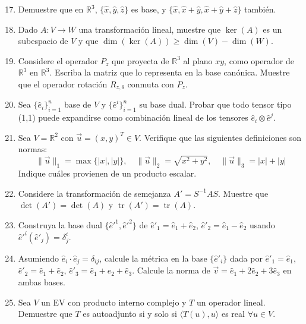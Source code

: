 \documentclass[12pt,a4paper]{article}
\begin{document}
\begin{enumerate}[1.]
\setcounter{enumi}{16}

\item Demuestre que en $\mathbb{R}^3$, $\{\hat{x},\hat{y},\hat{z}\}$ es base, y $\{\hat{x},\hat{x}+\hat{y},\hat{x}+\hat{y}+\hat{z}\}$ también.

\item Dado $A: V \to W$ una transformación lineal, muestre que $\ker(A)$ es un subespacio de $V$ y que $\dim(\ker(A)) \geq \dim(V) - \dim(W)$.

\item Considere el operador $P_z$ que proyecta de $\mathbb{R}^3$ al plano $xy$, como operador de $\mathbb{R}^3$ en $\mathbb{R}^3$. Escriba la matriz que lo representa en la base canónica. Muestre que el operador rotación $R_{z,\theta}$ conmuta con $P_z$.

\item Sea $\{\hat{e}_i\}_{i=1}^n$ base de $V$ y $\{\hat{e}^i\}_{i=1}^n$ su base dual. Probar que todo tensor tipo (1,1) puede expandirse como combinación lineal de los tensores $\hat{e}_i\otimes\hat{e}^j$.

\item Sea $V=\mathbb{R}^2$ con $\vec{u}=(x,y)^T\in V$. Verifique que las siguientes definiciones son normas:
\[
\|\vec{u}\|_1 = \max\{|x|,|y|\},\quad
\|\vec{u}\|_2 = \sqrt{x^2+y^2},\quad
\|\vec{u}\|_3 = |x|+|y|
\]
Indique cuáles provienen de un producto escalar.

\item Considere la transformación de semejanza $A' = S^{-1}AS$. Muestre que $\det(A')=\det(A)$ y $\operatorname{tr}(A')=\operatorname{tr}(A)$.

\item Construya la base dual $\{\hat{e}'^1,\hat{e}'^2\}$ de $\hat{e}'_1=\hat{e}_1+\hat{e}_2$, $\hat{e}'_2=\hat{e}_1-\hat{e}_2$ usando $\hat{e}'^i(\hat{e}'_j)=\delta^i_j$.

\item Asumiendo $\hat{e}_i\cdot\hat{e}_j=\delta_{ij}$, calcule la métrica en la base $\{\hat{e}'_i\}$ dada por $\hat{e}'_1=\hat{e}_1$, $\hat{e}'_2=\hat{e}_1+\hat{e}_2$, $\hat{e}'_3=\hat{e}_1+\hat{e}_2+\hat{e}_3$. Calcule la norma de $\vec{v}=\hat{e}_1+2\hat{e}_2+3\hat{e}_3$ en ambas bases.

\item Sea $V$ un EV con producto interno complejo y $T$ un operador lineal. Demuestre que $T$ es autoadjunto si y solo si $\langle T(u),u\rangle$ es real $\forall u\in V$.


\end{enumerate}
\end{document}
